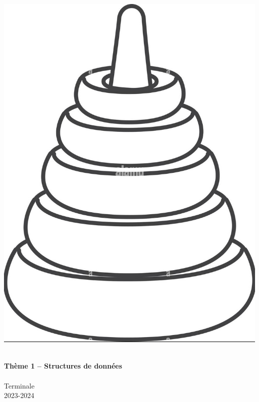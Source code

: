 \begin{titlepage}
\begin{minipage}{0.4\linewidth}
    \includegraphics[scale=0.08]{Thème 1 – Structures de données/Chapitre 1 - Interface et implémentation/BLOB/hanoi.jpg}
\end{minipage}

\HRule \\[0.4cm]
{ \huge \bfseries Thème 1 – Structures de données \\[0.15cm] }
\HRule \\[1.5cm]
Terminale
\\[1cm]
2023-2024 \\ [1cm]
\end{titlepage}